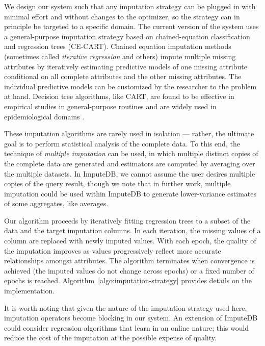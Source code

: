 We design our system such that any imputation strategy can be plugged in with minimal effort
and without changes to the optimizer, so the strategy can in principle be targeted to a
specific domain. The current version of the system uses a general-purpose imputation
strategy based on chained-equation classification and regression trees (CE-CART). Chained
equation imputation methods \cite{vanbuuren2011mice} (sometimes called \textit{iterative
regression} \cite{gelman2006data} and others) impute multiple missing attributes by
iteratively estimating predictive models of one missing attribute conditional on all
complete attributes and the other missing attributes. The individual predictive models can
be customized by the researcher to the problem at hand. Decision tree algorithms, like CART,
are found to be effective \cite{akande2015empirical} in empirical studies in general-purpose
routines and are widely used in epidemiological domains \cite{burgette2011multiple}.  

These imputation algorithms are rarely used in isolation --- rather, the ultimate goal is to
perform statistical analysis of the complete data. To this end, the technique of
\textit{multiple imputation} can be used, in which multiple distinct copies of the complete
data are generated and estimators are computed by averaging over the multiple datasets. In
ImputeDB, we cannot assume the user desires multiple copies of the query result, though we
note that in further work, multiple imputation could be used within ImputeDB to generate
lower-variance estimates of some aggregates, like averages.

Our algorithm proceeds by iteratively fitting regression trees to a subset of the data and
the target imputation columns. In each iteration, the missing values of a column are
replaced with newly imputed values. With each epoch, the quality of the imputation improves
as values progressively reflect more accurate relationships amongst attributes. The
algorithm terminates when convergence is achieved (the imputed values do not change across
epochs) or a fixed number of epochs is reached.  Algorithm~\ref{algo:imputation-strategy}
provides details on the implementation.  

It is worth noting that given the nature of the imputation strategy used here, imputation
operators become blocking in our system. An extension of ImputeDB could consider regression
algorithms that learn in an online nature; this would reduce the cost of the imputation at
the possible expense of quality.

